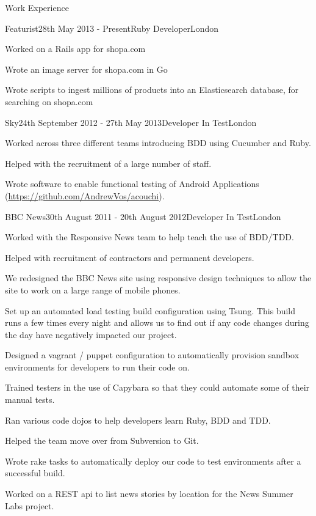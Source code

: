 \documentclass{resume}
\begin{document}
  \begin{rSection}{Work Experience}
    \begin{rSubsection}{Featurist}{28th May 2013 - Present}{Ruby Developer}{London}
    \item Worked on a Rails app for shopa.com
    \item Wrote an image server for shopa.com in Go
    \item Wrote scripts to ingest millions of products into an Elasticsearch database, for searching on shopa.com
    \end{rSubsection}

    \begin{rSubsection}{Sky}{24th September 2012 - 27th May 2013}{Developer In Test}{London}
      \item Worked across three different teams introducing BDD using Cucumber and Ruby.
      \item Helped with the recruitment of a large number of staff.
      \item Wrote software to enable functional testing of Android Applications (\url{https://github.com/AndrewVos/acouchi}).
    \end{rSubsection}

    \begin{rSubsection}{BBC News}{30th August 2011 - 20th August 2012}{Developer In Test}{London}
      \item Worked with the Responsive News team to help teach the use of BDD/TDD.
      \item Helped with recruitment of contractors and permanent developers.
      \item We redesigned the BBC News site using responsive design techniques to allow the site to work on a large range of mobile phones.
      \item Set up an automated load testing build configuration using Tsung. This build runs a few times every night and allows us to find out if any code changes during the day have negatively impacted our project.
      \item Designed a vagrant / puppet configuration to automatically provision sandbox environments for developers to run their code on.
      \item Trained testers in the use of Capybara so that they could automate some of their manual tests.
      \item Ran various code dojos to help developers learn Ruby, BDD and TDD.
      \item Helped the team move over from Subversion to Git.
      \item Wrote rake tasks to automatically deploy our code to test environments after a successful build.
      \item Worked on a REST api to list news stories by location for the News Summer Labs project.
    \end{rSubsection}


\end{rSection}
\end{document}
